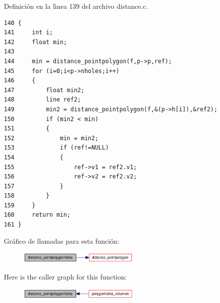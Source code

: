 Definici\'{o}n en la l\'{\i}nea 139 del archivo distance.c.

\begin{Code}\begin{verbatim}140 {
141     int i;
142     float min;
143 
144     min = distance_pointpolygon(f,p->p,ref);
145     for (i=0;i<p->nholes;i++)
146     {
147         float min2;
148         line ref2;
149         min2 = distance_pointpolygon(f,&(p->h[i]),&ref2);
150         if (min2 < min)
151         {
152             min = min2;
153             if (ref!=NULL)
154             {
155                 ref->v1 = ref2.v1;
156                 ref->v2 = ref2.v2;
157             }
158         }
159     }
160     return min;
161 }
\end{verbatim}\end{Code}




Gr\'{a}fico de llamadas para esta funci\'{o}n:\begin{figure}[H]
\begin{center}
\leavevmode
\includegraphics[width=168pt]{group__distance_gc837f0084791f42936ade857a0cce3af_gc837f0084791f42936ade857a0cce3af_cgraph}
\end{center}
\end{figure}


Here is the caller graph for this function:\begin{figure}[H]
\begin{center}
\leavevmode
\includegraphics[width=169pt]{group__distance_gc837f0084791f42936ade857a0cce3af_gc837f0084791f42936ade857a0cce3af_icgraph}
\end{center}
\end{figure}
